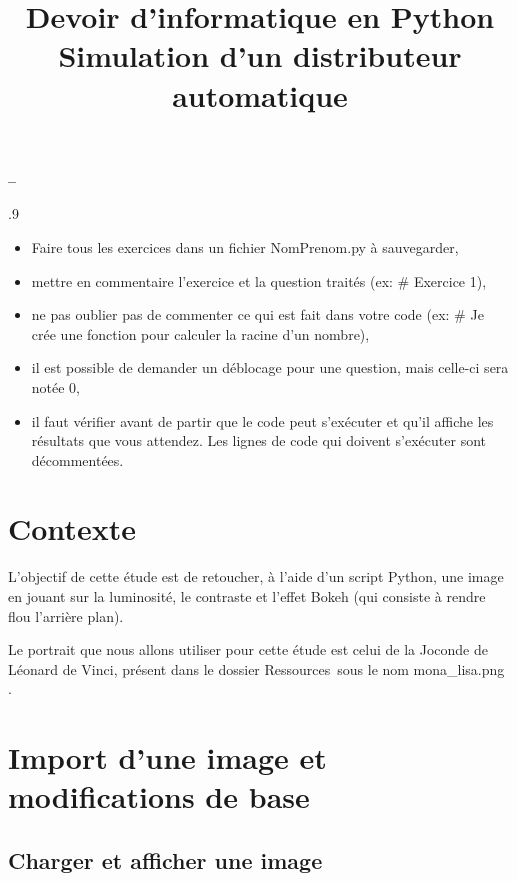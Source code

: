 

\begin{center}
{\Large\bf {\type} \no {\numero} -- \descrip}
\end{center}


\begin{boxedminipage}{.9\textwidth} 
\begin{itemize}
 \item Faire tous les exercices dans un fichier {NomPrenom.py} à sauvegarder,
 \item mettre en commentaire l'exercice et la question traités (ex: \# Exercice 1),
 \item ne pas oublier pas de commenter ce qui est fait dans votre code (ex: \# Je crée une fonction pour calculer la racine d'un nombre),
 \item il est possible de demander un déblocage pour une question, mais celle-ci sera notée 0,
 \item il faut vérifier avant de partir que le code peut s'exécuter et qu'il affiche les résultats que vous attendez. Les lignes de code qui doivent s'exécuter sont décommentées.
\end{itemize}
\end{boxedminipage}

\title{Devoir d'informatique en Python \\ \large Simulation d’un distributeur automatique}

\section*{Contexte}
L'objectif de cette étude est de retoucher, à l'aide d'un script Python, une image en jouant sur la luminosité, le contraste et l'effet Bokeh (qui consiste à rendre flou l'arrière plan).

Le portrait que nous allons utiliser pour cette étude est celui de la Joconde de Léonard de Vinci, présent dans le dossier \og Ressources\ \fg sous le nom \og mona\_lisa.png \fg.

\section{Import d'une image et modifications de base}

\subsection{Charger et afficher une image}

